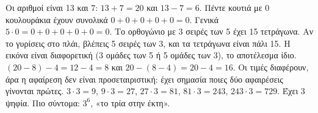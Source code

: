  Οι αριθμοί είναι 13 και 7: $13+7=20$ και $13-7=6$.
 Πέντε κουτιά με 0 κουλουράκια έχουν συνολικά $0+0+0+0+0=0$. Γενικά $5\cdot 0=0+0+0+0+0=0$.
 Το ορθογώνιο με 3 σειρές των 5 έχει 15 τετράγωνα. Αν το γυρίσεις στο πλάι, βλέπεις 5 σειρές των 3, και τα τετράγωνα είναι πάλι 15. Η εικόνα είναι διαφορετική (3 ομάδες των 5 ή 5 ομάδες των 3), το αποτέλεσμα ίδιο.
 $(20-8)-4=12-4=8$ και $20-(8-4)=20-4=16$. Οι τιμές διαφέρουν, άρα η αφαίρεση δεν είναι προσεταιριστική: έχει σημασία ποιες δύο αφαιρέσεις γίνονται πρώτες.
 $3\cdot 3=9$, $9\cdot 3=27$, $27\cdot 3=81$, $81\cdot 3=243$, $243\cdot 3=729$. Έχει 3 ψηφία. Πιο σύντομα: $3^6$, «το τρία στην έκτη».

